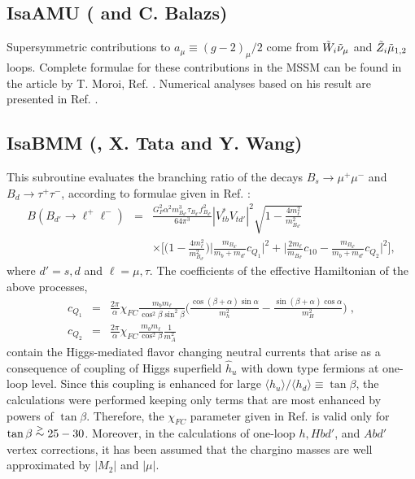 \subsection{IsaAMU ({} and C. Balazs)}

Supersymmetric contributions to $a_\mu\equiv (g-2)_\mu/2$ come from
$\tilde W_i\tilde\nu_\mu$ and $\tilde Z_i\tilde \mu_{1,2}$ loops.  Complete formulae for
these contributions in the MSSM can be found in the article by T. Moroi,
Ref. \cite{moroi}. Numerical analyses based on his result are presented
in Ref. \cite{bbft}.

\subsection{IsaBMM (, X. Tata and
Y. Wang)}

This subroutine evaluates the branching ratio of the decays
$B_s\rightarrow \mu^+\mu^-$ and $B_d\rightarrow \tau^+\tau^-$, according
to formulae given in Ref. \cite{mtw}:
\begin{eqnarray*}
B(B_{d'} \to \ell^+ \ell^-) &=& \frac{G_F^2\alpha^2 m^3_{B_{d'}} 
\tau_{B_{d'}} f^2_{B_{d'}}}{64\pi^3}
|V^\ast_{tb}V_{td'}|^2\sqrt{1-\frac{4m^2_\ell}{m^2_{B_{d'}}}}
\nonumber \\
&&\times\biggl[\biggl(1-\frac{4m^2_\ell}{m^2_{B_{d'}}}\biggr)
\bigg|\frac{m_{B_{d'}}}
{m_b+m_{d'}}c_{Q_1}\bigg|^2 + \bigg|\frac{2m_\ell}{m_{B_{d'}}}c_{10}
- \frac{m_{B_{d'}}}{m_b+m_{d'}} c_{Q_2}\bigg|^2\biggr],
\end{eqnarray*}
%
where $d'= s, d$ and $\ell = \mu, \tau$. The coefficients of the
effective Hamiltonian of the above processes,
\begin{eqnarray*}
c_{Q_1} &=& \frac{2\pi}{\alpha} \chi_{FC} \frac{m_b m_\ell}{\cos^2\beta
\sin^2\beta}\biggl(\frac{\cos(\beta+\alpha)\sin\alpha}{m^2_h} -
\frac{\sin(\beta+\alpha)\cos\alpha}{m^2_H}\biggr)\;, \nonumber
\\
c_{Q_2} &=& \frac{2\pi}{\alpha} \chi_{FC} \frac{m_b m_\ell}{\cos^2\beta}
\frac{1}{m^2_A}
\end{eqnarray*}
contain the  Higgs-mediated flavor changing  neutral currents that arise
as a consequence of coupling of Higgs superfield $\hat{h}_u$ with down
type fermions at one-loop level. Since this coupling is enhanced for 
large ${\langle h_u \rangle / \langle
h_d \rangle} \equiv \tan\beta$,  the calculations were  performed
keeping only  terms that are most  enhanced by powers of
$\tan\beta$. Therefore,  the $\chi_{FC}$ parameter given in
Ref. \cite{mtw} is  valid only for $\tan\beta \stackrel{>}{\sim} 25-30$.  Moreover,  
in the calculations of  one-loop $h, H b d'$,  and   
$A b d'$ vertex corrections, it has been assumed that the chargino masses 
are well approximated by  $|M_2|$ and $|\mu|$.

